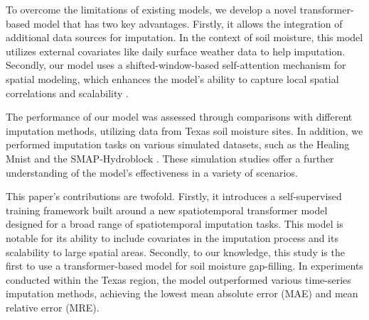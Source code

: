 \documentclass[review]{elsarticle}
\begin{document}
To overcome the limitations of existing models, we develop a novel transformer-based model that has two key advantages. Firstly, it allows the integration of additional data sources for imputation. In the context of soil moisture, this model utilizes external covariates like daily surface weather data to help imputation. Secondly, our model uses a shifted-window-based self-attention mechanism for spatial modeling, which enhances the model's ability to capture local spatial correlations and scalability \citep{liu2021swin}.

The performance of our model was assessed through comparisons with different imputation methods, utilizing data from Texas soil moisture sites. In addition, we performed imputation tasks on various simulated datasets, such as the Healing Mnist \citep{krishnan2015deep} and the SMAP-Hydroblock \citep{vergopolan2021smap}. These simulation studies offer a further understanding of the model's effectiveness in a variety of scenarios.


This paper's contributions are twofold. Firstly, it introduces a self-supervised training framework built around a new spatiotemporal transformer model designed for a broad range of spatiotemporal imputation tasks. This model is notable for its ability to include covariates in the imputation process and its scalability to large spatial areas. Secondly, to our knowledge, this study is the first to use a transformer-based model for soil moisture gap-filling. In experiments conducted within the Texas region, the model outperformed various time-series imputation methods, achieving the lowest mean absolute error (MAE) and mean relative error (MRE).
\end{document}
